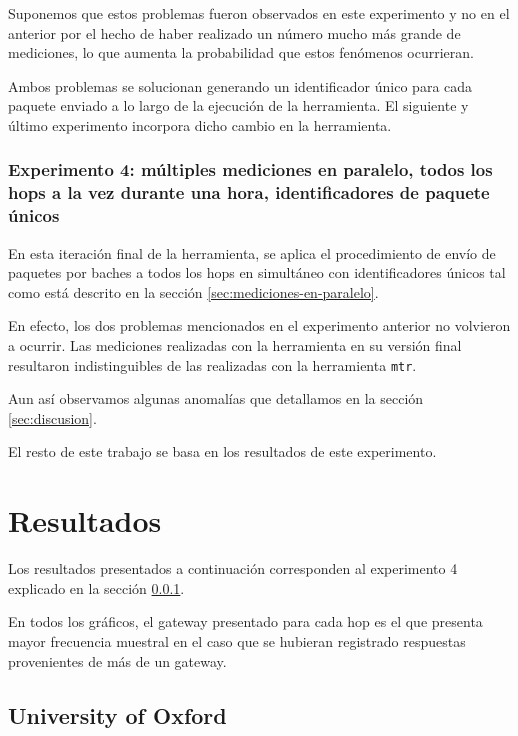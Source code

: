 \documentclass[a4paper, 10pt, twoside]{article}
\newcommand{\oxford}{University of Oxford}
\begin{document}
Suponemos que estos problemas fueron observados en este experimento y no en el anterior por el hecho de haber realizado un número mucho más grande de mediciones, lo que aumenta la probabilidad que estos fenómenos ocurrieran.

Ambos problemas se solucionan generando un identificador único para cada paquete enviado a lo largo de la ejecución de la herramienta. El siguiente y último experimento incorpora dicho cambio en la herramienta.


\subsubsection{Experimento 4: múltiples mediciones en paralelo, todos los hops a la vez durante una hora, identificadores de paquete únicos}
\label{sec:experimento-4}

En esta iteración final de la herramienta, se aplica el procedimiento de envío de paquetes por baches a todos los hops en simultáneo con identificadores únicos tal como está descrito en la sección \ref{sec:mediciones-en-paralelo}. 

En efecto, los dos problemas mencionados en el experimento anterior no volvieron a ocurrir. Las mediciones realizadas con la herramienta en su versión final resultaron indistinguibles de las realizadas con la herramienta \texttt{mtr}.

Aun así observamos algunas anomalías que detallamos en la sección \ref{sec:discusion}.

El resto de este trabajo se basa en los resultados de este experimento.




\section{Resultados}
\label{sec:resultados}

Los resultados presentados a continuación corresponden al experimento 4 explicado en la sección \ref{sec:experimento-4}.

En todos los gráficos, el gateway presentado para cada hop es el que presenta mayor frecuencia muestral en el caso que se hubieran registrado respuestas provenientes de más de un gateway.


\subsection{\oxford}
\end{document}
